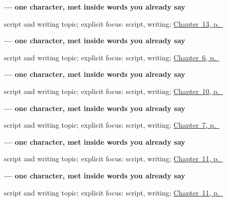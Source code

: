 \noindent\begin{minipage}[t]{\linewidth}
\raggedright
\textbf{ — one character, met inside words you already say}\par
\footnotesize script and writing topic; explicit focus: script, writing; \hyperref[ch:te-head-and-hand]{Chapter~13, p.~\pageref*{ch:te-head-and-hand}}
\end{minipage}\par\smallskip

\noindent\begin{minipage}[t]{\linewidth}
\raggedright
\textbf{ — one character, met inside words you already say}\par
\footnotesize script and writing topic; explicit focus: script, writing; \hyperref[ch:te-dative-case]{Chapter~6, p.~\pageref*{ch:te-dative-case}}
\end{minipage}\par\smallskip

\noindent\begin{minipage}[t]{\linewidth}
\raggedright
\textbf{ — one character, met inside words you already say}\par
\footnotesize script and writing topic; explicit focus: script, writing; \hyperref[ch:te-days-of-the-week]{Chapter~10, p.~\pageref*{ch:te-days-of-the-week}}
\end{minipage}\par\smallskip

\noindent\begin{minipage}[t]{\linewidth}
\raggedright
\textbf{ — one character, met inside words you already say}\par
\footnotesize script and writing topic; explicit focus: script, writing; \hyperref[ch:te-numbers-one-to-ten]{Chapter~7, p.~\pageref*{ch:te-numbers-one-to-ten}}
\end{minipage}\par\smallskip

\noindent\begin{minipage}[t]{\linewidth}
\raggedright
\textbf{ — one character, met inside words you already say}\par
\footnotesize script and writing topic; explicit focus: script, writing; \hyperref[ch:te-core-colours]{Chapter~11, p.~\pageref*{ch:te-core-colours}}
\end{minipage}\par\smallskip

\noindent\begin{minipage}[t]{\linewidth}
\raggedright
\textbf{ — one character, met inside words you already say}\par
\footnotesize script and writing topic; explicit focus: script, writing; \hyperref[ch:te-core-colours]{Chapter~11, p.~\pageref*{ch:te-core-colours}}
\end{minipage}\par\smallskip

